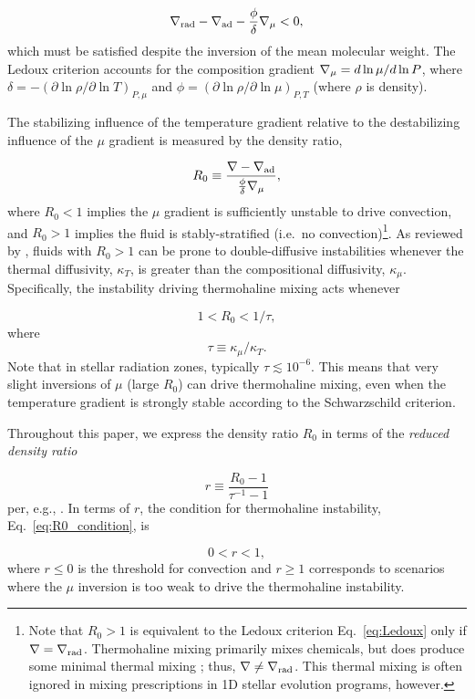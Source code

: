 \begin{equation} \label{eq:Ledoux}
    \gradrad - \gradad - \frac{\phi}{\delta}\gradmu < 0,
\end{equation}
which must be satisfied despite the inversion of the mean molecular weight.
The Ledoux criterion accounts for the composition gradient $\nabla_{\mu} = d\ln\mu/d\ln P$, where $\delta = -(\partial \ln \rho / \partial \ln T)_{P,\mu}$ and $\phi = (\partial \ln \rho / \partial \ln\mu)_{P,T}$ (where $\rho$ is density).

The stabilizing influence of the temperature gradient relative to the destabilizing influence of the $\mu$ gradient is measured by the density ratio,

\begin{equation} \label{eq:R0}
    R_0 \equiv \frac{\grad - \gradad}{\frac{\phi}{\delta} \gradmu},
\end{equation}
where $R_0 < 1$ implies the $\mu$ gradient is sufficiently unstable to drive convection, and $R_0 > 1$ implies the fluid is stably-stratified (i.e.~no convection)\footnote{Note that $R_0>1$ is equivalent to the Ledoux criterion Eq.~\eqref{eq:Ledoux} only if $\nabla = \nabla_{\rm{rad}}$. Thermohaline mixing primarily mixes chemicals, but does produce some minimal thermal mixing \citep[see, e.g., Fig.~4 of][]{brown_etal_2013}; thus, $\nabla \neq \nabla_{\rm{rad}}$. This thermal mixing is often ignored in mixing prescriptions in 1D stellar evolution programs, however.}. 
As reviewed by \citet{garaud_DDC_review_2018}, fluids with $R_0 > 1$ can be prone to double-diffusive instabilities whenever the thermal diffusivity, $\kappa_T$, is greater than the compositional diffusivity, $\kappa_\mu$. Specifically, the instability driving thermohaline mixing acts whenever

\begin{equation} \label{eq:R0_condition}
1 < R_0 < 1/\tau,
\end{equation}
\citep{baines_gill_1969} where
\begin{equation} \label{eq:tau}
    \tau \equiv \kappa_\mu/\kappa_T.
\end{equation}
Note that in stellar radiation zones, typically $\tau \lesssim 10^{-6}$. This means that very slight inversions of $\mu$ (large $R_0$) can drive thermohaline mixing, even when the temperature gradient is strongly stable according to the Schwarzschild criterion. 

Throughout this paper, we express the density ratio $R_0$ in terms of the \textit{reduced density ratio}

\begin{equation} \label{eq:r}
    r \equiv \frac{R_0 - 1}{\tau^{-1} - 1}
\end{equation}
per, e.g., \citet{traxler_etal_2011,brown_etal_2013}.
In terms of $r$, the condition for thermohaline instability, Eq.~\eqref{eq:R0_condition}, is

\begin{equation} \label{eq:r_condition}
    0 < r < 1,
\end{equation}
where $r \leq 0$ is the threshold for convection and $r \geq 1$ corresponds to scenarios where the $\mu$ inversion is too weak to drive the thermohaline instability.